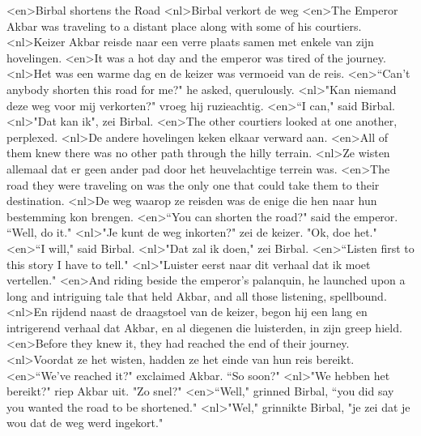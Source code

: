 <en>Birbal shortens the  Road
<nl>Birbal verkort de weg
<en>The Emperor Akbar was traveling to a distant place along with some of his courtiers.
<nl>Keizer Akbar reisde naar een verre plaats samen met enkele van zijn hovelingen.
<en>It was a hot day and the emperor was tired of the journey.
<nl>Het was een warme dag en de keizer was vermoeid van de reis.
<en>“Can’t anybody shorten this road for me?" he asked, querulously.
<nl>"Kan niemand deze weg voor mij verkorten?" vroeg hij ruzieachtig.
<en>“I can," said Birbal.
<nl>"Dat kan ik", zei Birbal.
<en>The other courtiers looked at one another, perplexed.
<nl>De andere hovelingen keken elkaar verward aan.
<en>All of them knew there was no other path through the hilly terrain.
<nl>Ze wisten allemaal dat er geen ander pad door het heuvelachtige terrein was.
<en>The road they were traveling on was the only one that could take them to their destination.
<nl>De weg waarop ze reisden was de enige die hen naar hun bestemming kon brengen.
<en>“You can shorten the road?" said the emperor. “Well, do it."
<nl>"Je kunt de weg inkorten?" zei de keizer. "Ok, doe het."
<en>“I will," said Birbal.
<nl>"Dat zal ik doen," zei Birbal.
<en>“Listen first to this story I have to tell."
<nl>"Luister eerst naar dit verhaal dat ik moet vertellen."
<en>And riding beside the emperor’s palanquin, he launched upon a long and intriguing tale that held Akbar,  and all those listening, spellbound.
<nl>En rijdend naast de draagstoel van de keizer, begon hij een lang en intrigerend verhaal dat Akbar, en al diegenen die luisterden, in zijn greep hield.
<en>Before they knew it, they had reached the end of their journey.
<nl>Voordat ze het wisten, hadden ze het einde van hun reis bereikt.
<en>“We’ve reached it?" exclaimed Akbar. “So soon?"
<nl>"We hebben het bereikt?" riep Akbar uit. "Zo snel?"
<en>“Well," grinned Birbal, “you did say you wanted the road to be shortened."
<nl>"Wel," grinnikte Birbal, "je zei dat je wou dat de weg werd ingekort."
